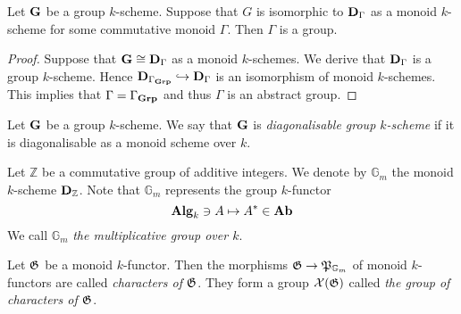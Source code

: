\begin{corollary}\label{corollary:diagonalisable_group_schemes}
Let $\mathbf{G}$ be a group $k$-scheme. Suppose that  $G$ is isomorphic to $\mathbf{D}_{\Gamma}$ as a monoid $k$-scheme for some commutative monoid $\Gamma$. Then $\Gamma$ is a group.
\end{corollary}
\begin{proof}
Suppose that $\mathbf{G}\cong \mathbf{D}_{\Gamma}$ as a monoid $k$-schemes. We derive that $\mathbf{D}_{\Gamma}$ is a group $k$-scheme. Hence $\mathbf{D}_{\Gamma_{\mathbf{Grp}}} \hookrightarrow \mathbf{D}_{\Gamma}$ is an isomorphism of monoid $k$-schemes. This implies that $\Gamma = \Gamma_{\mathbf{Grp}}$ and thus $\Gamma$ is an abstract group.
\end{proof}

\begin{definition}
Let $\mathbf{G}$ be a group $k$-scheme. We say that $\mathbf{G}$ is \textit{diagonalisable group $k$-scheme} if it is diagonalisable as a monoid scheme over $k$.
\end{definition}

\begin{example}\label{example:multiplicative_group}
Let $\mathbb{Z}$ be a commutative group of additive integers. We denote by $\mathbb{G}_{m}$ the monoid $k$-scheme $\mathbf{D}_{{\mathbb Z}}$. Note that $\mathbb{G}_{m}$ represents the group $k$-functor
$$\mathbf{Alg}_k\ni A\mapsto A^{*}\in \mathbf{Ab}$$
We call $\mathbb{G}_{m}$ \textit{the multiplicative group over $k$}.
\end{example}

\begin{definition}
Let ${\mathfrak G}$ be a monoid $k$-functor. Then the morphisms ${\mathfrak G}\rightarrow {\mathfrak P}_{\mathbb{G}_m}$ of monoid $k$-functors are called \textit{characters of ${\mathfrak G}$}. They form a group ${\mathcal X}({\mathfrak G})$ called \textit{the group of characters of ${\mathfrak G}$}.
\end{definition}

